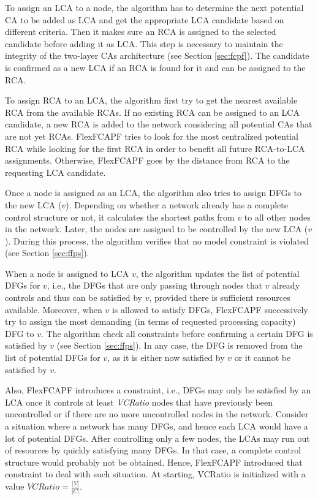 To assign an LCA to a node, the algorithm has to determine the next potential CA to be added as LCA and get the appropriate LCA candidate based on different criteria. Then it makes sure an RCA is assigned to the selected candidate before adding it as LCA. This step is necessary to maintain the integrity of the two-layer CAs architecture (see Section \ref{sec:fcpf}). The candidate is confirmed as a new LCA if an RCA is found for it and can be assigned to the RCA.

To assign RCA to an LCA, the algorithm first try to get the nearest available RCA from the available RCAs. If no existing RCA can be assigned to an LCA candidate, a new RCA is added to the network considering all potential CAs that are not yet RCAs. FlexFCAPF tries to look for the most centralized potential RCA while looking for the first RCA in order to benefit all future RCA-to-LCA assignments. Otherwise, FlexFCAPF goes by the distance from RCA to the requesting LCA candidate. 

Once a node is assigned as an LCA, the algorithm also tries to assign DFGs to the new LCA ($v$). Depending on whether a network already has a complete control structure or not, it calculates the shortest paths from $v$ to all other nodes in the network. Later, the nodes are assigned to be controlled by the new LCA ($v$). During this process, the algorithm verifies that no model constraint is violated (see Section \ref{sec:ffps}).

When a node is assigned to LCA $v$, the algorithm updates the list of potential DFGs for $v$, i.e., the DFGs that are only passing through nodes that $v$ already controls and thus can be satisfied by $v$, provided there is sufficient resources available. Moreover, when $v$ is allowed to satisfy DFGs, FlexFCAPF successively try to assign the most demanding (in terms of requested processing capacity) DFG to $v$. The algorithm check all constraints before confirming a certain DFG is satisfied by $v$ (see Section \ref{sec:ffps}). In any case, the DFG is removed from the list of potential DFGs for $ v$, as it is either now satisfied by $v$ or it cannot be satisfied by $v$. 

Also, FlexFCAPF introduces a constraint, i.e., DFGs may only be satisfied by an LCA once it controls at least \textit{VCRatio} nodes that have previously been uncontrolled or if there are no more uncontrolled nodes in the network. Consider a situation where a network has many DFGs, and hence each LCA would have a lot of potential DFGs. After controlling only a few nodes, the LCAs may run out of resources by quickly satisfying many DFGs. In that case, a complete control structure would probably not be obtained. Hence, FlexFCAPF introduced that constraint to deal with such situation. At starting, VCRatio is initialized with a value $VCRatio = \frac{|V|}{|C|}$. 

